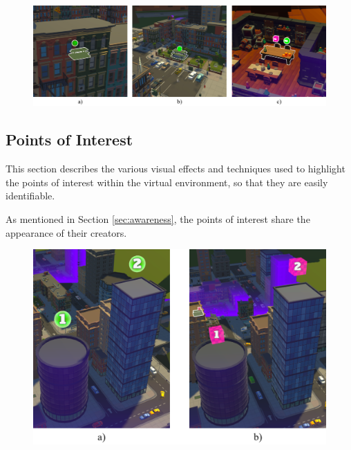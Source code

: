         \begin{figure}[h!]
            \centering
            \includegraphics[width=1\textwidth]{figures/table_behind.png}
            \label{fig:table_visibility}
        \end{figure}


    \subsection{Points of Interest} \label{sec:visual_poi}

        This section describes the various visual effects and techniques used to highlight the points of interest within the virtual environment, so that they are easily identifiable.

        As mentioned in Section \ref{sec:awareness}, the points of interest share the appearance of their creators.


        \begin{figure}[h!]
            \centering
            \includegraphics[width=.8\textwidth]{figures/poi_appearance.png}
            \label{fig:table_visibility}
        \end{figure}

